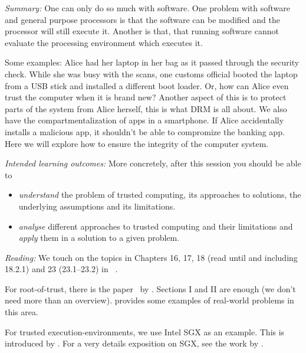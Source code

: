 \emph{Summary:}
One can only do so much with software.
One problem with software and general purpose processors is that the software 
can be modified and the processor will still execute it.
Another is that, that running software cannot evaluate the processing 
environment which executes it.

Some examples: Alice had her laptop in her bag as it passed through the 
security check.
While she was busy with the scans, one customs official booted the laptop from 
a USB stick and installed a different boot loader.
Or, how can Alice even trust the computer when it is brand new?
Another aspect of this is to protect parts of the system from Alice herself, 
\eg this is what \ac{DRM} is all about.
We also have the compartmentalization of apps in a smartphone.
If Alice accidentally installs a malicious app, it shouldn't be able to 
compromize the banking app.
Here we will explore how to ensure the integrity of the computer system.

\emph{Intended learning outcomes:}
More concretely, after this session you should be able to
\begin{itemize}
  \item \emph{understand} the problem of trusted computing, its approaches to 
    solutions, the underlying assumptions and its limitations.
  \item \emph{analyse} different approaches to trusted computing and their 
    limitations and \emph{apply} them in a solution to a given problem.
\end{itemize}

\emph{Reading:}
We touch on the topics in Chapters 16, 17, 18 (read until and including 
18.2.1) and 
23 (23.1--23.2) in ~\cite{Anderson2008sea}.

For root-of-trust, there is the 
paper~\cite{EstablishRootOfTrustUnconditionally} by 
\citeauthor{EstablishRootOfTrustUnconditionally}.
Sections I and II are enough (we don't need more than an overview).
\Textcite{HDDmalware,USBmalware,BIOSmalware} provides some examples of 
real-world problems in this area.

For trusted execution-environments, we use Intel SGX as an example.
This is introduced by \textcite{IntelSGXTutorial}.
For a very details exposition on SGX, see the work by 
\textcite{IntelSGXExplained}.
